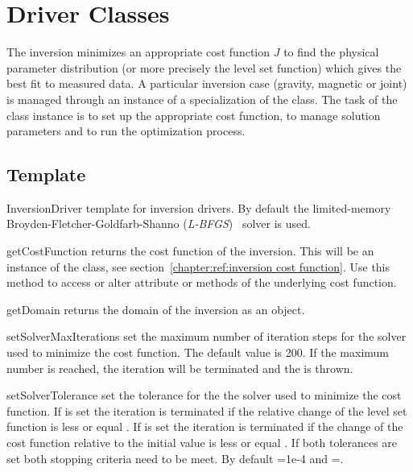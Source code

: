 


\section{Driver Classes}
The inversion minimizes an appropriate cost function $J$ to find the physical parameter distribution 
(or more precisely the level set function) which gives the best fit to measured data. A 
particular inversion case (gravity, magnetic or joint) is managed through 
an instance of a specialization of the  class. The task of the class instance
is to set up the appropriate cost function, to manage solution parameters and to run the optimization process.

\subsection{Template}
\begin{classdesc*}{InversionDriver}
template for inversion drivers. By default the limited-memory Broyden-Fletcher-Goldfarb-Shanno (\emph{L-BFGS})~\cite{L-BFGS} solver is used.
\end{classdesc*}
 
\begin{methoddesc}[InversionDriver]{getCostFunction}{}
returns the cost function of the inversion. This will be an instance of the  class, see section~\ref{chapter:ref:inversion cost function}.
Use this method to access or alter attribute or methods of the underlying cost function.
\end{methoddesc}

\begin{methoddesc}[InversionDriver]{getDomain}{}
returns the domain of the inversion as an \escript {} object.
\end{methoddesc}

        
\begin{methoddesc}[InversionDriver]{setSolverMaxIterations}{}
set the maximum number of iteration steps for the solver used to minimize the cost function. The default value is 200.
If the maximum number is reached, the iteration will be terminated and the  is thrown.
\end{methoddesc}

\begin{methoddesc}[InversionDriver]{setSolverTolerance}{ }
set the tolerance for the the solver used to minimize the cost function. If  is set the iteration is terminated 
if the relative change of the level set function is less or equal . 
 If  is set the iteration is terminated 
if the change of the cost function relative to the initial value is less or equal . If both 
tolerances are set both stopping criteria need to be meet. By default =1e-4 and =\None.
\end{methoddesc}


